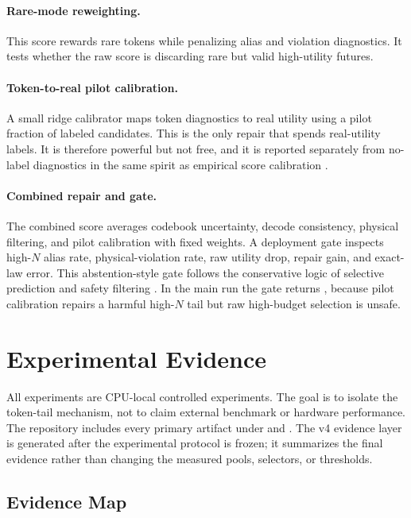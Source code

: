 \documentclass{article}
\begin{document}
\paragraph{Rare-mode reweighting.}
This score rewards rare tokens while penalizing alias and violation diagnostics. It tests whether the raw score is discarding rare but valid high-utility futures.

\paragraph{Token-to-real pilot calibration.}
A small ridge calibrator maps token diagnostics to real utility using a pilot fraction of labeled candidates. This is the only repair that spends real-utility labels. It is therefore powerful but not free, and it is reported separately from no-label diagnostics in the same spirit as empirical score calibration \citep{zadrozny2002transforming,guo2017calibration}.

\paragraph{Combined repair and gate.}
The combined score averages codebook uncertainty, decode consistency, physical filtering, and pilot calibration with fixed weights. A deployment gate inspects high-$N$ alias rate, physical-violation rate, raw utility drop, repair gain, and exact-law error. This abstention-style gate follows the conservative logic of selective prediction and safety filtering \citep{geifman2017selective,wabersich2021predictive}. In the main run the gate returns \VThreeGateAction{}, because pilot calibration repairs a harmful high-$N$ tail but raw high-budget selection is unsafe.

\section{Experimental Evidence}
\label{sec:experiments}

All experiments are CPU-local controlled experiments. The goal is to isolate the token-tail mechanism, not to claim external benchmark or hardware performance. The repository includes every primary artifact under  and . The v4 evidence layer is generated after the experimental protocol is frozen; it summarizes the final evidence rather than changing the measured pools, selectors, or thresholds.

\subsection{Evidence Map}
\end{document}
